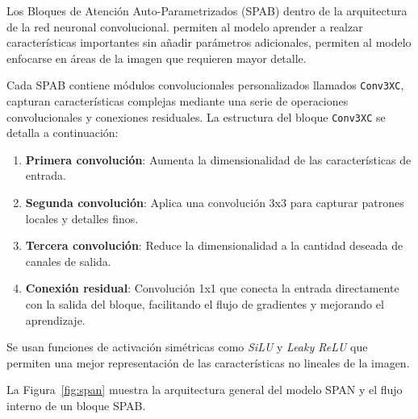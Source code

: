         Los Bloques de Atención Auto-Parametrizados (SPAB) dentro de la arquitectura de la red neuronal convolucional. permiten al modelo aprender a realzar características importantes sin añadir parámetros adicionales, permiten al modelo enfocarse en áreas de la imagen que requieren mayor detalle.

        Cada SPAB contiene módulos convolucionales personalizados llamados \texttt{Conv3XC}, capturan características complejas mediante una serie de operaciones convolucionales y conexiones residuales. La estructura del bloque \texttt{Conv3XC} se detalla a continuación:

        \begin{enumerate}
            \item \textbf{Primera convolución}: Aumenta la dimensionalidad de las características de entrada.
            \item \textbf{Segunda convolución}: Aplica una convolución 3x3 para capturar patrones locales y detalles finos.
            \item \textbf{Tercera convolución}: Reduce la dimensionalidad a la cantidad deseada de canales de salida.
            \item \textbf{Conexión residual}: Convolución 1x1 que conecta la entrada directamente con la salida del bloque, facilitando el flujo de gradientes y mejorando el aprendizaje.
        \end{enumerate}

        Se usan funciones de activación simétricas como \textit{SiLU} y \textit{Leaky ReLU} que permiten una mejor representación de las características no lineales de la imagen.

        La Figura~\ref{fig:span} muestra la arquitectura general del modelo SPAN y el flujo interno de un bloque SPAB.

